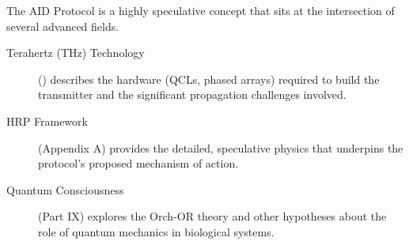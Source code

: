 \begin{importantbox}[title={Further Reading}]
    The AID Protocol is a highly speculative concept that sits at the intersection of several advanced fields.
    \begin{description}
        \item[Terahertz (THz) Technology] () describes the hardware (QCLs, phased arrays) required to build the transmitter and the significant propagation challenges involved.
        \item[HRP Framework] (Appendix A) provides the detailed, speculative physics that underpins the protocol's proposed mechanism of action.
        \item[Quantum Consciousness] (Part IX) explores the Orch-OR theory and other hypotheses about the role of quantum mechanics in biological systems.
    \end{description}
\end{importantbox}
